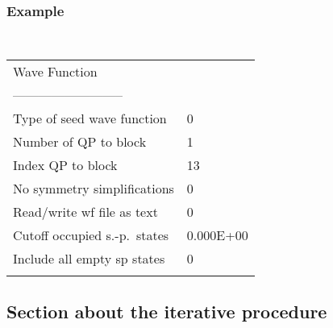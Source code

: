 \documentclass[a4paper,11pt]{article}
\begin{document}
\subsubsection*{Example}
\begin{center}
\tt
\begin{tabular}{|ll|}
\hline
Wave Function                 &          \\
--------------------------    &          \\
Type of seed wave function    &0         \\
Number of QP to block         &1         \\
Index QP to block             &13        \\
No symmetry simplifications   &0         \\
Read/write wf file as text    &0         \\
Cutoff occupied s.-p.\ states &0.000E+00 \\
Include all empty sp states   &0         \\
                              &          \\
\hline
\end{tabular}
\end{center}

%
%
\subsection{Section about the iterative procedure}
\end{document}
